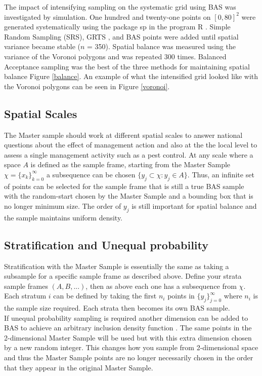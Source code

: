 \documentclass[]{article}
\begin{document}
The impact of intensifying sampling on the systematic grid using BAS was investigated by simulation. One hundred and twenty-one points on $[0,80]^2$ were generated systematically using the package sp in the program R \cite{R, sp1, sp2}. Simple Random Sampling (SRS), GRTS \cite{spsurvey}, and BAS points were added until spatial variance became stable ($n$ = 350). Spatial balance was measured using the variance of the Voronoi polygons \cite{Robertson2013, StevensOlsen2004, Grafstrom2012} and was repeated 300 times. Balanced Acceptance sampling was the best of the three methods for maintaining spatial balance Figure \ref{balance}. An example of what the intensified grid looked like with the Voronoi polygons can be seen in Figure \ref{voronoi}.\\

\subsection{Spatial Scales}
The Master sample should work at different spatial scales to answer national questions about the effect of management action and also at the the local level to assess a single management activity such as a pest control. At any scale where a space $A$ is defined as the sample frame, starting from the Master Sample $\chi = \{x_k\}_{k=0}^{\infty}$ a subsequence can be chosen $\{y_j \subset \chi: y_j\in A\}$. Thus, an infinite set of points can be selected for the sample frame that is still a true BAS sample with the random-start chosen by the Master Sample and a bounding box that is no longer minimum size. The order of $y_j$ is still important for  spatial balance and the sample maintains uniform density.\\

\subsection{Stratification and Unequal probability}
Stratification with the Master Sample is essentially the same as taking a subsample for a specific sample frame as described above. Define your strata sample frames $(A,B,...)$, then as above each one has a subsequence from $\chi$. Each stratum $i$ can be defined by taking the first $n_i$ points in $\{y_j\}_{j=0}^{\infty}$ where $n_i$ is the sample size required. Each strata then becomes its own BAS sample.\\

If unequal probability sampling is required another dimension can be added to BAS to achieve an arbitrary inclusion density function \cite{Robertson2013}. The same points in the 2-dimensional Master Sample will be used but with this extra dimension chosen by a new random integer. This changes how you sample from 2-dimensional space and thus the Master Sample points are no longer necessarily chosen in the order that they appear in the original Master Sample.
\end{document}
